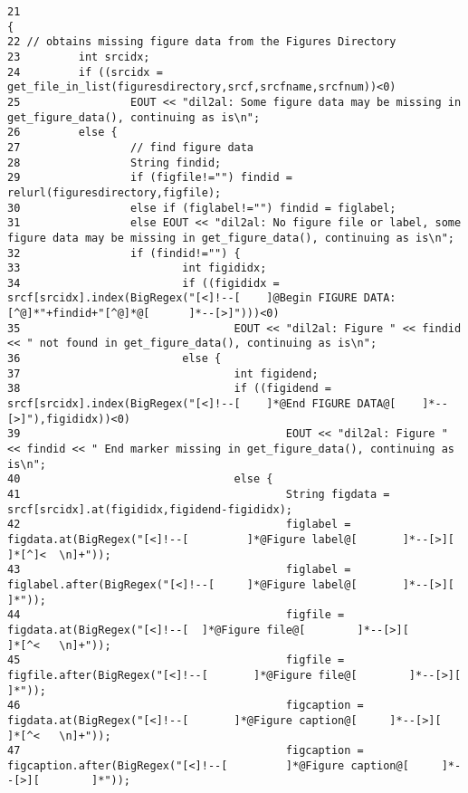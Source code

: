 \footnotesize\begin{verbatim}21                                                                                                                                                                 {
22 // obtains missing figure data from the Figures Directory
23         int srcidx;
24         if ((srcidx = get_file_in_list(figuresdirectory,srcf,srcfname,srcfnum))<0)
25                 EOUT << "dil2al: Some figure data may be missing in get_figure_data(), continuing as is\n";
26         else {
27                 // find figure data
28                 String findid;
29                 if (figfile!="") findid = relurl(figuresdirectory,figfile);
30                 else if (figlabel!="") findid = figlabel;
31                 else EOUT << "dil2al: No figure file or label, some figure data may be missing in get_figure_data(), continuing as is\n";
32                 if (findid!="") {
33                         int figididx;
34                         if ((figididx = srcf[srcidx].index(BigRegex("[<]!--[    ]@Begin FIGURE DATA:[^@]*"+findid+"[^@]*@[      ]*--[>]")))<0)
35                                 EOUT << "dil2al: Figure " << findid << " not found in get_figure_data(), continuing as is\n";
36                         else {
37                                 int figidend;
38                                 if ((figidend = srcf[srcidx].index(BigRegex("[<]!--[    ]*@End FIGURE DATA@[    ]*--[>]"),figididx))<0)
39                                         EOUT << "dil2al: Figure " << findid << " End marker missing in get_figure_data(), continuing as is\n";
40                                 else {
41                                         String figdata = srcf[srcidx].at(figididx,figidend-figididx);
42                                         figlabel = figdata.at(BigRegex("[<]!--[         ]*@Figure label@[       ]*--[>][        ]*[^]<  \n]+"));
43                                         figlabel = figlabel.after(BigRegex("[<]!--[     ]*@Figure label@[       ]*--[>][        ]*"));
44                                         figfile = figdata.at(BigRegex("[<]!--[  ]*@Figure file@[        ]*--[>][        ]*[^<   \n]+"));
45                                         figfile = figfile.after(BigRegex("[<]!--[       ]*@Figure file@[        ]*--[>][        ]*"));
46                                         figcaption = figdata.at(BigRegex("[<]!--[       ]*@Figure caption@[     ]*--[>][        ]*[^<   \n]+"));
47                                         figcaption = figcaption.after(BigRegex("[<]!--[         ]*@Figure caption@[     ]*--[>][        ]*"));

\end{verbatim}
